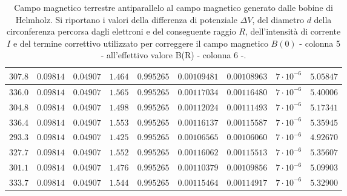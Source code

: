 \documentclass[]{article}
\begin{document}
\begin{table}
\begin{tabular}{||c|c|c|c|c|c|c|c|c||}
    $307.8$ & $0.09814$ & $0.04907$ & $1.464$ & $0.995265$ & $0.00109481$ & $0.00108963$ & $7 \cdot 10^{-6}$ & $5.05847$ \\\hline
    $336.0$ & $0.09814$ & $0.04907$ & $1.565$ & $0.995265$ & $0.00117034$ & $0.00116480$ & $7 \cdot 10^{-6}$ & $5.40006$ \\\hline
    $304.8$ & $0.09814$ & $0.04907$ & $1.498$ & $0.995265$ & $0.00112024$ & $0.00111493$ & $7 \cdot 10^{-6}$ & $5.17341$ \\\hline
    $336.4$ & $0.09814$ & $0.04907$ & $1.553$ & $0.995265$ & $0.00116137$ & $0.00115587$ & $7 \cdot 10^{-6}$ & $5.35945$ \\\hline
    $293.3$ & $0.09814$ & $0.04907$ & $1.425$ & $0.995265$ & $0.00106565$ & $0.00106060$ & $7 \cdot 10^{-6}$ & $4.92670$ \\\hline
    $327.7$ & $0.09814$ & $0.04907$ & $1.552$ & $0.995265$ & $0.00116062$ & $0.00115513$ & $7 \cdot 10^{-6}$ & $5.35607$ \\\hline
    $301.1$ & $0.09814$ & $0.04907$ & $1.476$ & $0.995265$ & $0.00110379$ & $0.00109856$ & $7 \cdot 10^{-6}$ & $5.09903$ \\\hline
    $333.7$ & $0.09814$ & $0.04907$ & $1.544$ & $0.995265$ & $0.00115464$ & $0.00114917$ & $7 \cdot 10^{-6}$ & $5.32900$ \\\hline

\end{tabular}
    \caption{Campo magnetico terrestre antiparallelo al campo magnetico generato dalle bobine di Helmholz. Si riportano i valori della differenza di potenziale $\Delta V$, del diametro $ d $ della circonferenza percorsa dagli elettroni e del conseguente raggio $ R $, dell'intensità di corrente $ I $ e del termine correttivo utilizzato per correggere il campo magnetico $B(0)$ - colonna 5 - all'effettivo valore B(R) - colonna 6 -.}
    \label{CM_antiparallelo}
\end{table}
\end{document}
